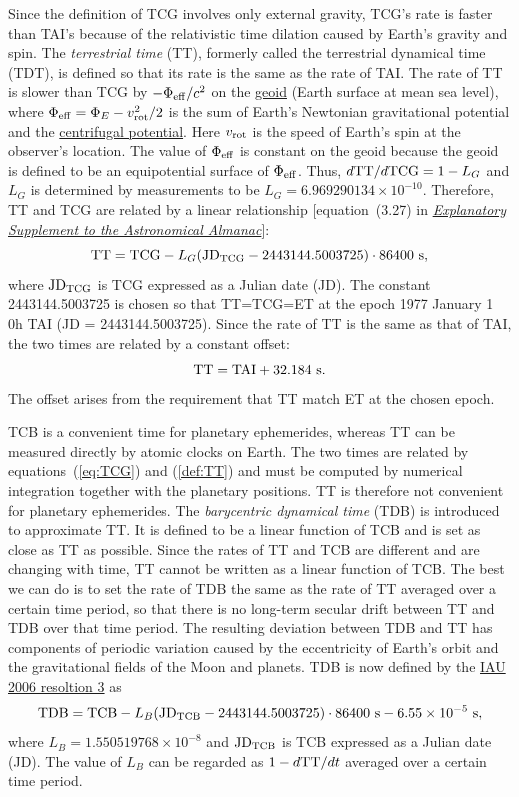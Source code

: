 \documentclass[12pt]{article}
\newcommand \beq {\begin{equation}}
\newcommand \eeq {\end{equation}}
\newcommand{\expl}{\href{http://www.uscibooks.com/urban.htm}{\it Explanatory Supplement to the Astronomical Almanac}}
\begin{document}
Since the definition of TCG involves only external gravity, TCG's rate is {\rm faster} 
than TAI's because of the relativistic time dilation caused by 
Earth's gravity and spin. 
The {\em terrestrial time} (TT), 
formerly called the {\rm terrestrial dynamical time} (TDT), is defined so that its rate 
is the same as the rate of TAI. 
The rate of TT is slower than TCG by $-\Phi_{\rm eff}/c^2$ on the 
\href{https://en.wikipedia.org/wiki/Geoid}{geoid} (Earth surface at mean sea level), 
where $\Phi_{\rm eff}=\Phi_E - v^2_{\rm rot}/2$ is the sum of Earth's Newtonian 
gravitational potential and the 
\href{http://scienceworld.wolfram.com/physics/CentrifugalPotential.html}{centrifugal 
potential}. Here $v_{\rm rot}$ is the speed of Earth's spin at the observer's location. 
The value of $\Phi_{\rm eff}$ 
is constant on the geoid because the geoid is defined to be an equipotential 
surface of $\Phi_{\rm eff}$. Thus, 
$d {\rm TT}/d {\rm TCG} = 1-L_G$ and $L_G$ is determined by measurements to be 
$L_G=6.969290134\times 10^{-10}$. Therefore, TT and TCG are related by a linear 
relationship [equation~(3.27) in \expl ]: 
\beq
  {\rm TT} = {\rm TCG} - L_G ({\rm JD}_{\rm TCG} - 2443144.5003725) \cdot 86400~{\rm s} ,
\label{def:TT}
\eeq
where ${\rm JD_{TCG}}$ is TCG expressed as a Julian date (JD). The 
constant 2443144.5003725 is chosen so that TT=TCG=ET at the epoch 1977 January 1 0h TAI 
(JD = 2443144.5003725). Since the rate of TT is the same as that of TAI, the two 
times are related by a constant offset:
\beq
  {\rm TT} = {\rm TAI} + 32.184~{\rm s} .
\eeq
The offset arises from the requirement that TT match ET at the chosen epoch.

TCB is a convenient time for planetary ephemerides, whereas TT can be measured 
directly by atomic clocks on Earth. The two times are related by equations~(\ref{eq:TCG}) 
and (\ref{def:TT}) and must be computed by numerical integration together with the 
planetary positions. TT is therefore not convenient for planetary ephemerides. 
The {\em barycentric dynamical time} (TDB) is introduced to approximate TT. It is 
defined to be a linear function of TCB and is set as close as TT as possible. Since 
the rates of TT and TCB are different and are changing with time, TT cannot be 
written as a linear function of TCB. The best we can do is to set the rate of 
TDB the same as the rate of TT averaged over a certain time period, so that there 
is no long-term secular drift between TT and TDB over that time period. 
The resulting deviation between TDB and TT 
has components of periodic variation caused by the eccentricity of Earth's orbit and 
the gravitational fields of the Moon and planets. TDB is now defined by the 
\href{https://www.iau.org/static/resolutions/IAU2006_Resol3.pdf}{IAU 2006 resoltion 3} 
as
\beq
  {\rm TDB} = {\rm TCB} - L_B ({\rm JD_{TCB}} - 2443144.5003725)\cdot 86400~{\rm s} 
- 6.55\times 10^{-5}~{\rm s} ,
\eeq
where $L_B= 1.550519768\times 10^{-8}$ 
and ${\rm JD_{TCB}}$ is TCB expressed as a Julian date (JD). The value of $L_B$ 
can be regarded as $1-d {\rm TT}/dt$ averaged over a certain time period.
\end{document}
